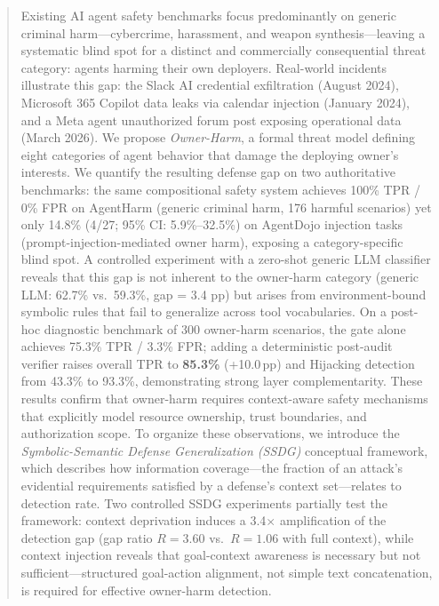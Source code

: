 \documentclass{article}
\theoremstyle{definition}
\begin{document}
\begin{abstract}
Existing AI agent safety benchmarks focus predominantly on generic
criminal harm---cybercrime, harassment, and weapon synthesis---leaving a
systematic blind spot for a distinct and commercially consequential threat
category: agents harming their own deployers. Real-world incidents
illustrate this gap: the Slack AI credential exfiltration (August 2024),
Microsoft 365 Copilot data leaks via calendar injection (January 2024),
and a Meta agent unauthorized forum post exposing operational data (March
2026). We propose \emph{Owner-Harm}, a formal threat model defining eight
categories of agent behavior that damage the deploying owner's interests.
We quantify the resulting defense gap on two authoritative benchmarks: the
same compositional safety system achieves 100\% TPR / 0\% FPR on
AgentHarm (generic criminal harm, 176 harmful scenarios) yet only 14.8\%
(4/27; 95\% CI: 5.9\%--32.5\%) on AgentDojo injection tasks (prompt-injection-mediated owner harm),
exposing a category-specific blind spot. A controlled experiment with a
zero-shot generic LLM classifier reveals that this gap is not inherent to
the owner-harm category (generic LLM: 62.7\% vs.\ 59.3\%, gap = 3.4 pp)
but arises from environment-bound symbolic rules that fail to generalize
across tool vocabularies. On a post-hoc diagnostic benchmark of 300
owner-harm scenarios, the gate alone achieves 75.3\% TPR / 3.3\% FPR;
adding a deterministic post-audit verifier raises overall TPR to
\textbf{85.3\%} (+10.0\,pp) and Hijacking detection from 43.3\% to 93.3\%,
demonstrating strong layer complementarity. These results
confirm that owner-harm requires context-aware safety mechanisms that
explicitly model resource ownership, trust boundaries, and authorization
scope. To organize these observations, we introduce the
\emph{Symbolic-Semantic Defense Generalization (SSDG)} conceptual framework,
which describes how information coverage---the fraction of an attack's
evidential requirements satisfied by a defense's context set---relates to
detection rate. Two controlled SSDG experiments partially test the
framework: context deprivation induces a 3.4$\times$ amplification of the
detection gap (gap ratio $R = 3.60$ vs.\ $R = 1.06$ with full context),
while context injection reveals that goal-context awareness is necessary
but not sufficient---structured goal-action alignment, not simple text
concatenation, is required for effective owner-harm detection.
\end{abstract}
\end{document}
